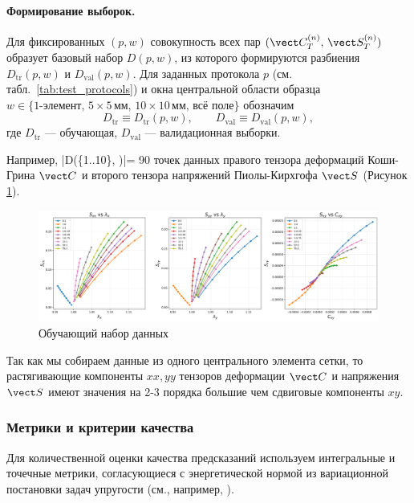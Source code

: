 \paragraph{Формирование выборок.}
Для фиксированных $(p,w)$ совокупность всех пар $(\vect C_T^{(n)},\,\vect S_T^{(n)})$ образует базовый набор $D(p,w)$, из которого формируются разбиения $D_{\mathrm{tr}}(p,w)$ и $D_{\mathrm{val}}(p,w)$.
Для заданных протокола $p$ (см. табл.~\ref{tab:test_protocols}) 
и окна центральной области образца 
$w\in\{\text{1-элемент},\,5\times5\,\text{мм},\,10\times10\,\text{мм},\,\text{всё поле}\}$ обозначим
\[
  D_{\mathrm{tr}}\equiv D_{\mathrm{tr}}(p,w),\qquad D_{\mathrm{val}}\equiv D_{\mathrm{val}}(p,w),
\]
где $D_{\mathrm{tr}}$ — обучающая, $D_{\mathrm{val}}$ — валидационная выборки.

Например, |D(\{1..10\}, )|= 90 точек данных правого тензора деформаций Коши-Грина $\vect C$ 
и второго тензора напряжений Пиолы-Кирхгофа $\vect S$ (Рисунок \ref{fig:training_data}).

\begin{figure}[H]
  \centering
  \includegraphics[width=1.0\textwidth]{img/all_stress_plots.png}
  \caption{Обучающий набор данных}
  \label{fig:training_data}
\end{figure}

Так как мы собираем данные из одного центрального элемента сетки, то растягивающие компоненты $xx, yy$ тензоров деформации $\vect C$ и напряжения
$\vect S$ имеют значения на 2-3 порядка большие чем сдвиговые компоненты $xy$.

\subsubsection{Метрики и критерии качества}
\label{sec:metrics}

Для количественной оценки качества предсказаний используем интегральные и точечные метрики, согласующиеся с энергетической нормой из вариационной постановки задач упругости (см., например, \cite{ciarlet1988mathematical,ogden1997nonlinear,holzapfel2000nonlinear}).

